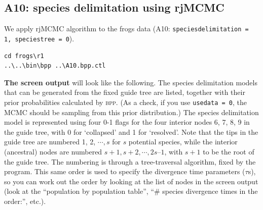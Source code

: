 \documentclass[a4paper]{book}
\numberwithin{equation}{section} \renewcommand{\baselinestretch}{0.55}
\begin{document}
\subsection{A10: species delimitation using rjMCMC}

We apply rjMCMC algorithm to the frogs data (A10:
\texttt{speciesdelimitation = 1, speciestree = 0}).
\begin{verbatim}
cd frogs\r1
..\..\bin\bpp ..\A10.bpp.ctl
\end{verbatim}
\textbf{The screen output} will look like the following.  The species
delimitation models that can be generated from the fixed guide tree
are listed, together with their prior probabilities calculated by
\textsc{bpp}.  (As a check, if you use \texttt{usedata = 0}, the MCMC
should be sampling from this prior distribution.)  The species
delimitation model is represented using four 0-1 flags for the four
interior nodes 6, 7, 8, 9 in the guide tree, with 0 for ‘collapsed’
and 1 for ‘resolved’.  Note that the tips in the guide tree are
numbered 1, 2, $\cdots, s$ for $s$ potential species, while the
interior (ancestral) nodes are numbered
$s + 1, s + 2, \cdots, 2s – 1$, with $s + 1$ to be the root of the
guide tree.  The numbering is through a tree-traversal algorithm,
fixed by the program.  This same order is used to specify the
divergence time parameters ($\tau$s), so you can work out the order by
looking at the list of nodes in the screen output (look at the
``population by population table'', ``\# species divergence times in
the order:'', etc.).
\end{document}

